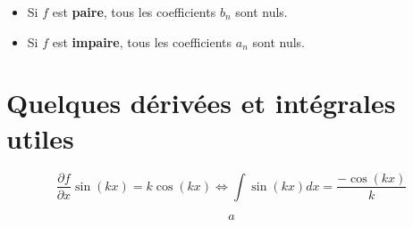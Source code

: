 \documentclass{article}
\begin{document}
\begin{itemize}
    \item Si $f$ est \textbf{paire}, tous les coefficients $b_n$ sont nuls.
    \item Si $f$ est \textbf{impaire}, tous les coefficients $a_n$ sont nuls.
\end{itemize}

\section{Quelques dérivées et intégrales utiles}
\begin{equation}
    \frac{\partial f}{\partial x} \sin(kx) = k \cos(kx) 
    \Leftrightarrow 
    \int \sin(kx) dx = \frac{-\cos(kx)}{k}
\end{equation}

\begin{equation}
    a
\end{equation}
\end{document}
